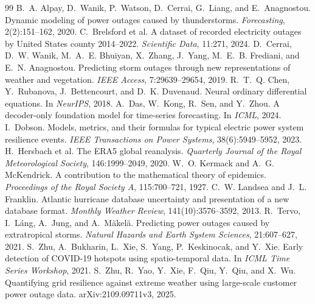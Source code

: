 \documentclass[10pt,twocolumn,letterpaper]{article}
\begin{document}

\begin{thebibliography}{99}
 B.~A. Alpay, D.~Wanik, P.~Watson, D.~Cerrai, G.~Liang, and E.~Anagnostou. Dynamic modeling of power
outages caused by thunderstorms. \emph{Forecasting}, 2(2):151--162, 2020.
 C.~Brelsford et al. A dataset of recorded electricity outages by United States county
2014--2022. \emph{Scientific Data}, 11:271, 2024.
 D.~Cerrai, D.~W. Wanik, M.~A.~E. Bhuiyan, X.~Zhang, J.~Yang, M.~E.~B. Frediani, and E.~N.
Anagnostou. Predicting storm outages through new representations of weather and vegetation. \emph{IEEE Access},
7:29639--29654, 2019.
 R.~T.~Q. Chen, Y.~Rubanova, J.~Bettencourt, and D.~K. Duvenaud. Neural ordinary differential
equations. In \emph{NeurIPS}, 2018.
 A.~Das, W.~Kong, R.~Sen, and Y.~Zhou. A decoder-only foundation model for time-series forecasting. In
\emph{ICML}, 2024.
 I.~Dobson. Models, metrics, and their formulas for typical electric power system resilience
events. \emph{IEEE Transactions on Power Systems}, 38(6):5949--5952, 2023.
 H.~Hersbach et al. The ERA5 global reanalysis. \emph{Quarterly Journal of the Royal
Meteorological Society}, 146:1999--2049, 2020.
 W.~O. Kermack and A.~G. McKendrick. A contribution to the mathematical theory of epidemics.
\emph{Proceedings of the Royal Society A}, 115:700--721, 1927.
 C.~W. Landsea and J.~L. Franklin. Atlantic hurricane database uncertainty and presentation of a
new database format. \emph{Monthly Weather Review}, 141(10):3576--3592, 2013.
 R.~Tervo, I.~L\'ang, A.~Jung, and A.~M\"akel\"a. Predicting power outages caused by extratropical
storms. \emph{Natural Hazards and Earth System Sciences}, 21:607--627, 2021.
 S.~Zhu, A.~Bukharin, L.~Xie, S.~Yang, P.~Keskinocak, and Y.~Xie. Early detection of COVID-19
hotspots using spatio-temporal data. In \emph{ICML Time Series Workshop}, 2021.
 S.~Zhu, R.~Yao, Y.~Xie, F.~Qiu, Y.~Qiu, and X.~Wu. Quantifying grid resilience against extreme weather
using large-scale customer power outage data. arXiv:2109.09711v3, 2025.
\end{thebibliography}
\end{document}
